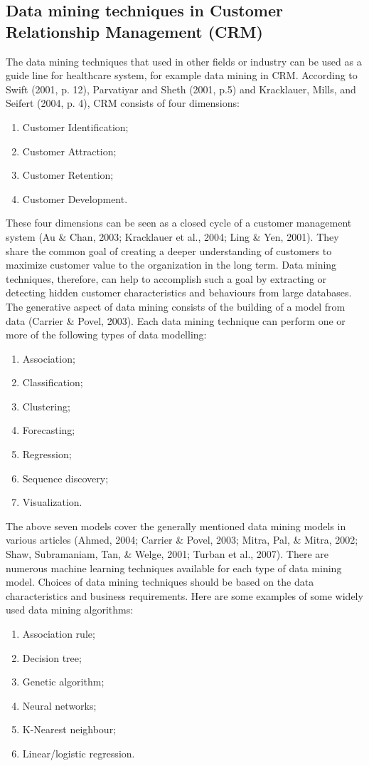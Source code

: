 \documentclass[10pt,twocolumn]{article}
\begin{document}
\subsection{Data mining techniques in Customer Relationship Management (CRM)}
The data mining techniques that used in other fields or industry can be used as a guide line for healthcare system, for example data mining in CRM.\cite{ref10} According to Swift (2001, p. 12)\cite{ref13}, Parvatiyar and Sheth (2001, p.5)\cite{ref14} and Kracklauer, Mills, and Seifert (2004, p. 4)\cite{ref15}, CRM consists of four dimensions:
\begin{enumerate}
\item Customer Identification;
\item Customer Attraction;
\item Customer Retention;
\item Customer Development.
\end{enumerate}
 These four dimensions can be seen as a closed cycle of a customer management system (Au \& Chan, 2003;\cite{ref16} Kracklauer et al., 2004;\cite{ref15} Ling \& Yen, 2001\cite{ref17}). They share the common goal of creating a deeper understanding of customers to maximize customer value to the organization in the long term. Data mining techniques, therefore, can help to accomplish such a goal by extracting or detecting hidden customer characteristics and behaviours from large databases. The generative aspect of data mining consists of the building of a model from data (Carrier \& Povel, 2003)\cite{ref18}. Each data mining technique can perform one or more of the following types of data modelling: 
 \begin{enumerate}
\item Association; 
\item Classification; 
\item Clustering; 
\item Forecasting; 
\item Regression; 
\item Sequence discovery; 
\item Visualization. 
 \end{enumerate}
 The above seven models cover the generally mentioned data mining models in various articles (Ahmed, 2004;\cite{ref19} Carrier \& Povel, 2003;\cite{ref18} Mitra, Pal, \& Mitra, 2002;\cite{ref20} Shaw, Subramaniam, Tan, \& Welge, 2001;\cite{ref21} Turban et al., 2007\cite{ref22}). There are numerous machine learning techniques available for each type of data mining model. Choices of data mining techniques should be based on the data characteristics and business requirements\cite{ref18}. Here are some examples of some widely used data mining algorithms: 
 \begin{enumerate}
 \item Association rule; 
 \item Decision tree; 
 \item Genetic algorithm; 
 \item Neural networks; 
 \item K-Nearest neighbour; 
 \item Linear/logistic regression.
 \end{enumerate}
 
\end{document}
